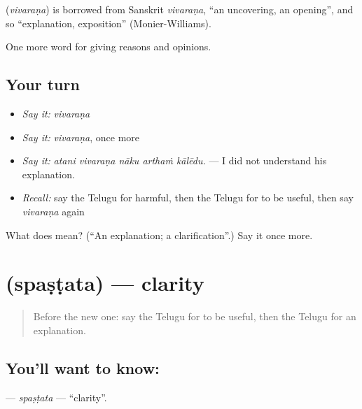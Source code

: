 \begin{cousinweb}
\textbf{} (\emph{vivaraṇa}) is borrowed from Sanskrit \emph{vivaraṇa}, \textquotedblleft{}an uncovering, an opening\textquotedblright{}, and so \textquotedblleft{}explanation, exposition\textquotedblright{} (Monier-Williams).
\end{cousinweb}

\begin{grammarlens}[title={What you've built}]
One more word for giving reasons and opinions.
\end{grammarlens}

\subsection*{Your turn}
\begin{itemize}
\raggedright
  \item \emph{Say it:} \emph{vivaraṇa}
  \item \emph{Say it:} \emph{vivaraṇa}, once more
  \item \emph{Say it:} \emph{atani vivaraṇa nāku arthaṁ kālēdu.} — I did not understand his explanation.
  \item \emph{Recall:} say the Telugu for harmful, then the Telugu for to be useful, then say \emph{vivaraṇa} again
\end{itemize}

\begin{tcolorbox}[breakable,colback=teal!4,colframe=teal!35!black,title={Before you move on}]
What does  mean? (\textquotedblleft{}An explanation; a clarification\textquotedblright{}.) Say it once more.
\end{tcolorbox}
\section[\texorpdfstring{\te{స్పష్టత} (spaṣṭata)}{స్పష్టత (spaṣṭata)}]{ (spaṣṭata) — clarity}

\label{lesson:TE-C394-spastata}



\begin{quote}
Before the new one: say the Telugu for to be useful, then the Telugu for an explanation.
\end{quote}

\subsection*{You'll want to know: }
\textbf{} — \emph{spaṣṭata} — \textquotedblleft{}clarity\textquotedblright{}.

